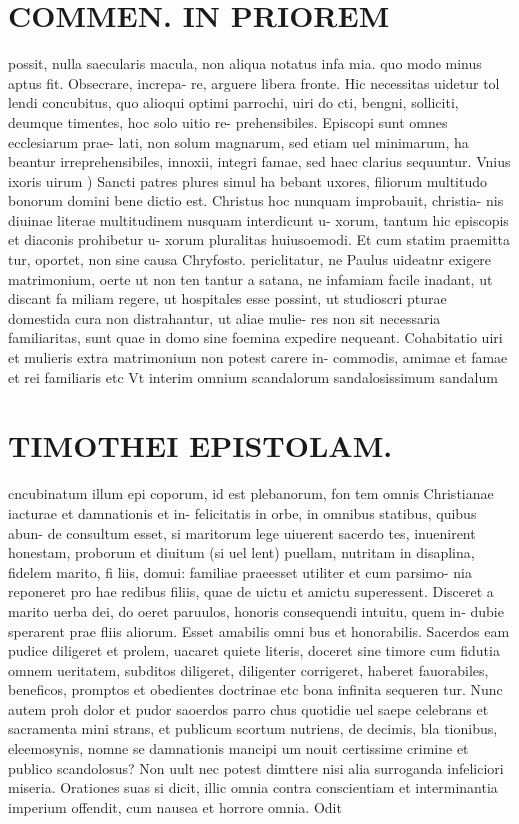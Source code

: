 \documentclass{article}
\begin{document}
\begin{pages}
\section*{COMMEN. IN PRIOREM }
\marginpar{[ p.66 ]}\pstart possit, nulla saecularis macula, non aliqua notatus infa mia. quo modo minus aptus fit. Obsecrare, increpa- re, arguere libera fronte. Hic necessitas uidetur tol lendi concubitus, quo alioqui optimi parrochi, uiri do cti, bengni, solliciti, deumque timentes, hoc solo uitio re- prehensibiles. Episcopi sunt omnes ecclesiarum prae- lati, non solum magnarum, sed etiam uel minimarum, ha beantur irreprehensibiles, innoxii, integri famae, sed haec clarius sequuntur.  \pend\pstart Vnius ixoris uirum ) Sancti patres plures simul ha bebant uxores, filiorum multitudo bonorum domini bene dictio est. Christus hoc nunquam improbauit, christia- nis diuinae literae multitudinem nusquam interdicunt u- xorum, tantum hic episcopis et diaconis prohibetur u- xorum pluralitas huiusoemodi. Et cum statim praemitta tur, oportet, non sine causa Chryfosto. periclitatur, ne Paulus uideatnr exigere matrimonium, oerte ut non ten tantur a satana, ne infamiam facile inadant, ut discant fa miliam regere, ut hospitales esse possint, ut studioscri pturae domestida cura non distrahantur, ut aliae mulie- res non sit necessaria familiaritas, sunt quae in domo sine foemina expedire nequeant. Cohabitatio uiri et mulieris extra matrimonium non potest carere in- commodis, amimae et famae et rei familiaris etc Vt interim omnium scandalorum sandalosissimum sandalum  \pend
\section*{TIMOTHEI EPISTOLAM. }
\marginpar{[ p.67 ]}\pstart cncubinatum illum epi coporum, id est plebanorum, fon tem omnis Christianae iacturae et damnationis et in- felicitatis in orbe, in omnibus statibus, quibus abun- de consultum esset, si maritorum lege uiuerent sacerdo tes, inuenirent honestam, proborum et diuitum (si uel lent) puellam, nutritam in disaplina, fidelem marito, fi liis, domui: familiae praeesset utiliter et cum parsimo- nia reponeret pro hae redibus filiis, quae de uictu et amictu superessent. Disceret a marito uerba dei, do oeret paruulos, honoris consequendi intuitu, quem in- dubie sperarent prae fliis aliorum. Esset amabilis omni bus et honorabilis. Sacerdos eam pudice diligeret et prolem, uacaret quiete literis, doceret sine timore cum fidutia omnem ueritatem, subditos diligeret, diligenter corrigeret, haberet fauorabiles, beneficos, promptos et obedientes doctrinae etc bona infinita sequeren tur. Nunc autem proh dolor et pudor saoerdos parro chus quotidie uel saepe celebrans et sacramenta mini strans, et publicum scortum nutriens, de decimis, bla tionibus, eleemosynis, nomne se damnationis mancipi um nouit certissime crimine et publico scandolosus? Non uult nec potest dimttere nisi alia surroganda infeliciori miseria. Orationes suas si dicit, illic omnia contra conscientiam et interminantia imperium offendit, cum nausea et horrore omnia. Odit  \pend

\end{pages}
\end{document}
